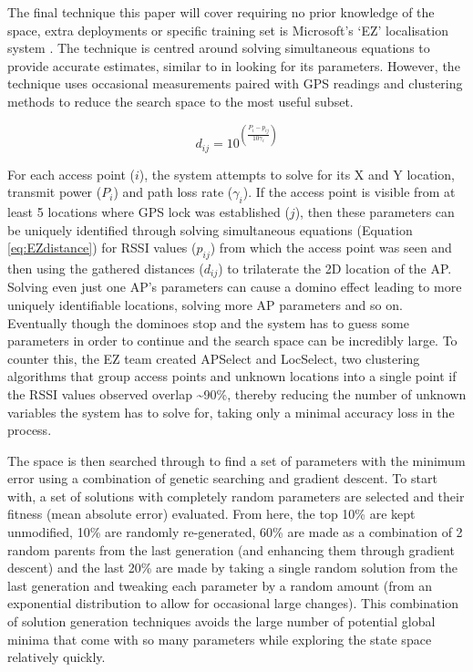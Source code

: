 \documentclass{UoYCSproject}
\begin{document}
                The final technique this paper will cover requiring no prior knowledge of the space, extra deployments or specific training set is Microsoft's `EZ' localisation system \citep{chintalapudi2010indoor}. The technique is centred around solving simultaneous equations to provide accurate estimates, similar to \citet{madigan2005bayesian} in looking for its parameters. However, the technique uses occasional measurements paired with GPS readings and clustering methods to reduce the search space to the most useful subset. 
                
                \begin{equation} \label{eq:EZdistance}
                    d_{ij} = 10^{\left(\frac{P_i - p_{ij}}{10\gamma_i}\right)}
                \end{equation}
                
                For each access point ($i$), the system attempts to solve for its X and Y location, transmit power ($P_i$) and path loss rate ($\gamma_i$). If the access point is visible from at least 5 locations where GPS lock was established ($j$), then these parameters can be uniquely identified through solving simultaneous equations (Equation \ref{eq:EZdistance}) for RSSI values ($p_{ij}$) from which the access point was seen and then using the gathered distances ($d_{ij}$) to trilaterate the 2D location of the AP. Solving even just one AP's parameters can cause a domino effect leading to more uniquely identifiable locations, solving more AP parameters and so on. Eventually though the dominoes stop and the system has to guess some parameters in order to continue and the search space can be incredibly large. To counter this, the EZ team created APSelect and LocSelect, two clustering algorithms that group access points and unknown locations into a single point if the RSSI values observed overlap \textasciitilde90\%, thereby reducing the number of unknown variables the system has to solve for, taking only a minimal accuracy loss in the process.
                
                The space is then searched through to find a set of parameters with the minimum error using a combination of genetic searching and gradient descent. To start with, a set of solutions with completely random parameters are selected and their fitness (mean absolute error) evaluated. From here, the top 10\% are kept unmodified, 10\% are randomly re-generated, 60\% are made as a combination of 2 random parents from the last generation (and enhancing them through gradient descent) and the last 20\% are made by taking a single random solution from the last generation and tweaking each parameter by a random amount (from an exponential distribution to allow for occasional large changes). This combination of solution generation techniques avoids the large number of potential global minima that come with so many parameters while exploring the state space relatively quickly.
                
\end{document}
